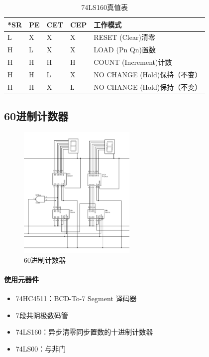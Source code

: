 \documentclass[lang=cn, 11pt, a4paper, cite=authornum, ctexfont]{paper}
\begin{document}
\begin{table}[H]
	\begin{center}
		\begin{tabular}{|l|l|l|l|l|}
			\hline
			*SR & PE & CET & CEP & 工作模式                   \\ \hline
			L   & X  & X   & X   & RESET (Clear)清零        \\ \hline
			H   & L  & X   & X   & LOAD (Pn  Qn)置数        \\ \hline
			H   & H  & H   & H   & COUNT (Increment)计数    \\ \hline
			H   & H  & L   & X   & NO CHANGE (Hold)保持（不变） \\ \hline
			H   & H  & X   & L   & NO CHANGE (Hold)保持（不变） \\ \hline
		\end{tabular}
		\caption{74LS160真值表}
	\end{center}
\end{table}

\subsection{60进制计数器}

\begin{figure}[H]
	\begin{center}
		\includegraphics[width=0.5\textwidth]{pdf/计数器-60进制.PDF}
		\caption{60进制计数器\label{ifg:count60}}
	\end{center}
\end{figure}

\paragraph{使用元器件}
\begin{itemize}
	\item 74HC4511：BCD-To-7 Segment 译码器
	\item 7段共阴极数码管
	\item 74LS160：异步清零同步置数的十进制计数器
	\item 74LS00：与非门
\end{itemize}
\end{document}
